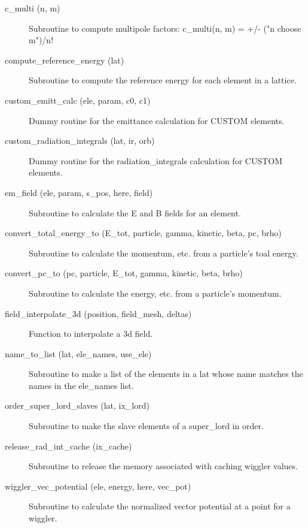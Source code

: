\begin{description}

\item[c_multi (n, m)] \Newline
Subroutine to compute multipole factors: 
c_multi(n, m) = +/- ("n choose m")/n! 

\item[compute_reference_energy (lat)] \Newline
Subroutine to compute the reference energy for each element in a lattice. 

\item[custom_emitt_calc (ele, param, c0, c1)] \Newline
Dummy routine for the emittance calculation for CUSTOM elements. 

\item[custom_radiation_integrals (lat, ir, orb)] \Newline
Dummy routine for the radiation_integrals calculation for CUSTOM elements. 

\item[em_field (ele, param, s_pos, here, field)] \Newline
Subroutine to calculate the E and B fields for an element. 

\item[convert_total_energy_to (E_tot, particle, gamma, kinetic, beta, pc, brho)] \Newline
Subroutine to calculate the momentum, etc. from a particle's toal energy. 

\item[convert_pc_to (pc, particle, E_tot, gamma, kinetic, beta, brho)] \Newline
Subroutine to calculate the energy, etc. from a particle's momentum. 

\item[field_interpolate_3d (position, field_mesh, deltas)] \Newline
Function to interpolate a 3d field. 

\item[name_to_list (lat, ele_names, use_ele)] \Newline
Subroutine to make a list of the elements in a lat 
whose name matches the names in the ele_names list. 

\item[order_super_lord_slaves (lat, ix_lord)] \Newline
Subroutine to make the slave elements of a super_lord in order. 

\item[release_rad_int_cache (ix_cache)] \Newline 
     Subroutine to release the memory associated with caching wiggler values.

\item[wiggler_vec_potential (ele, energy, here, vec_pot)] \Newline
Subroutine to calculate the normalized vector potential at a point for a wiggler.

\end{description}


